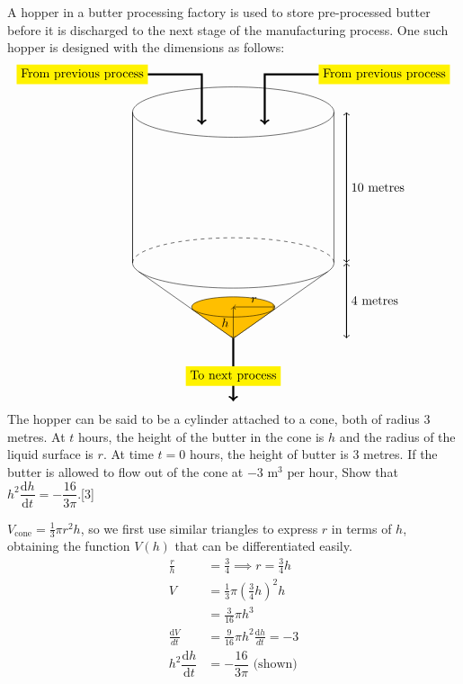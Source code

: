 \documentclass[12pt, a4 paper]{article}
\begin{document}
\begin{outline}[enumerate]
 \1 A hopper in a butter processing factory is used to store pre-processed butter before it is discharged to the next stage of the manufacturing process. One such hopper is designed with the dimensions as follows: %
 \[
  \begin{tikzpicture}
   \draw (0,0) ellipse (80pt and 20pt); %
   \draw (-80pt,0) -- (-80pt,-120pt);
   \draw (80pt,0) -- (80pt,-120pt);
   \draw (-80pt,0) -- (-80pt,-120pt);
   \draw[dashed] (-80pt,-120pt) arc (180:0:80pt and 20pt);
   \draw (-80pt,-120pt) arc (180:360:80pt and 20pt);
   \draw[<->,thick] (90pt,0) -- (90pt,-60pt) node[right] {10 metres} -- (90pt,-120pt);%
   \draw (-75pt,-127pt) -- (0, -180pt); %
   \draw (0,-180pt) -- (75pt,-127pt);
   \draw[<->,thick] (90pt,-120pt) -- (90pt,-150pt) node[right] {4 metres} -- (90pt,-180pt);%
   \draw[->,ultra thick] (-120pt,30pt) node [fill=yellow]{From previous process}-- (-25pt,30pt) -- (-25pt,-10pt); %
   \draw[->,ultra thick] (120pt,30pt) node [fill=yellow]{From previous process}-- (25pt,30pt) -- (25pt,-10pt);
   \draw[->,ultra thick] (0,-180pt) -- (0,-210pt) node[fill=yellow]{To next process} -- (0,-230pt); %
   \filldraw [orange!50!yellow,draw=black](0,-180pt) -- (33pt,-156.68pt) -- (-33pt,-156.68pt) -- cycle; %
   \filldraw [orange!50!yellow,draw=black](0,-155pt) ellipse (33pt and 8pt);
   \draw[<->] (0,-155pt) -- (16.5pt, -155pt) node [above]{$r$}-- (33pt,-155pt);
   \draw[<->] (0,-155pt) -- (0, -167.5pt) node [left]{$h$}-- (0,-180pt); %
  \end{tikzpicture}
 \]
 The hopper can be said to be a cylinder attached to a cone, both of radius 3 metres. At $t$ hours, the height of the butter in the cone is $h$ and the radius of the liquid surface is $r$. At time $t = 0$ hours, the height of butter is 3 metres.\newline
 If the butter is allowed to flow out of the cone at $- 3\textrm{ m}^3{\textrm{ per hour}}$,
 \2 Show that ${h^2}\dfrac{{{\mathrm{d}}h}}{{{\mathrm{d}}t}} =  - \dfrac{{16}}{{3\pi }}$.\hfill[3]
 \begin{answer}
 $V_{\textrm{cone}}=\frac{1}{3}\pi r^2 h$, so we first use similar triangles to express $r$ in terms of $h$, obtaining the function $V(h)$ that can be differentiated easily.
   \begin{align*}
     \frac{r}{h}&=\frac{3}{4} \implies r=\frac{3}{4}h \\
     V &= \frac{1}{3}\pi \left(\frac{3}{4}h\right)^2 h \\
     &= \frac{3}{16}\pi h^3\\
     \frac{\mathrm{d}V}{{d}t} &= \frac{9}{16}\pi h^2\frac{\mathrm{d}h}{{d}t} = -3 \\
     {h^2}\dfrac{{{\mathrm{d}}h}}{{{\mathrm{d}}t}} &=  - \dfrac{{16}}{{3\pi }} \textrm{ (shown)}
   \end{align*}
 \end{answer}


\end{outline}
\end{document}
